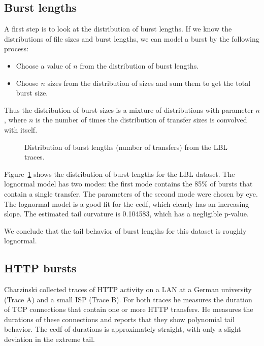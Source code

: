 \documentclass[twocolumn,11pt]{infocom}
\begin{document}
\subsection {Burst lengths}

A first step is to look at the distribution of burst lengths.
If we know the distributions of file sizes and burst lengths,
we can model a burst by the following
process:

\begin{itemize}

\item Choose a value of $n$ from the distribution of burst lengths.

\item Choose $n$ sizes from the distribution of sizes and sum them
to get the total burst size.

\end{itemize}

Thus the distribution of burst sizes is a mixture of distributions
with parameter $n$, where $n$ is the number of times the distribution
of transfer sizes is convolved with itself.

\begin{figure}[tb]
\centerline{}
\caption{Distribution of burst lengths (number of transfers) from the
LBL traces.}
\label{fig.ftp.length}
\end{figure}

Figure~\ref{fig.ftp.length} shows the distribution of burst lengths
for the LBL dataset.  The lognormal model has two modes: the first
mode contains the 85\% of bursts that contain a single transfer.  The
parameters of the second mode were chosen by eye.  The lognormal model
is a good fit for the ccdf, which clearly has an increasing slope.
The estimated tail curvature is 0.104583, which has a negligible
p-value.

We conclude that the tail behavior of burst lengths for this dataset
is roughly lognormal.



\subsection {HTTP bursts}

Charzinski \cite{Charzinski00} collected traces of HTTP activity on a
LAN at a German university (Trace A) and a small ISP (Trace B).  For
both traces he measures the duration of TCP connections that contain
one or more HTTP transfers.  He measures the durations of these
connections and reports that they show polynomial tail behavior.  The
ccdf of durations is approximately straight, with only a slight
deviation in the extreme tail.
\end{document}
